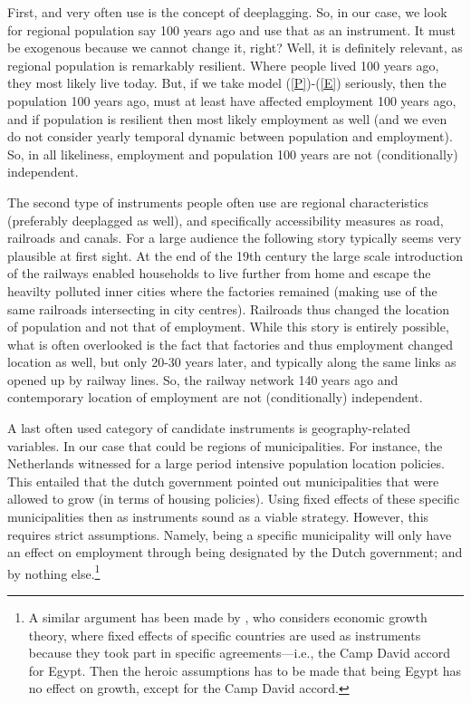 \documentclass[fleqn,10pt]{SelfArx} %
\begin{document}
First, and very often use is the concept of deeplagging. So, in our case, we
look for regional population say 100 years ago and use that as an instrument. It
must be exogenous because we cannot change it, right? Well, it is definitely
relevant, as regional population is remarkably resilient. Where people lived
100 years ago, they most likely live today. But, if we take model
(\ref{P})-(\ref{E}) seriously, then the population 100 years ago, must at least
have affected employment 100 years ago, and if population is resilient then most
likely employment as well (and we even do not consider yearly temporal dynamic
between population and employment). So, in all likeliness, employment and
population 100 years are not (conditionally) independent.

The second type of instruments people often use are regional characteristics
(preferably deeplagged as well), and specifically accessibility measures as
road, railroads and canals. For a large audience the following story typically seems very plausible at first
sight. At the end of the 19th century the large scale introduction of the
railways enabled households to live further from home and escape the heavilty
polluted inner cities where the factories remained (making use of the same
railroads intersecting in city centres). Railroads thus changed the location of
population and not that of employment. While this story is entirely possible,
what is often overlooked is the fact that factories and thus employment changed location as
well, but only 20-30 years later, and typically along the same links as opened
up by railway lines. So, the railway network 140 years ago and contemporary
location of employment are not (conditionally) independent.

A last often used category of candidate instruments is geography-related
variables. In our case that could be regions of municipalities. For instance,
the Netherlands witnessed for a large period intensive population location
policies. This entailed that the dutch government pointed out municipalities
that were allowed to grow (in terms of housing policies). Using fixed effects of
these specific municipalities then as instruments sound as a viable strategy.
However, this requires strict assumptions. Namely, being a specific municipality
will only have an effect on employment through being designated by the Dutch
government; and by nothing else.\footnote{A similar argument has been made by
  \cite{deaton2010instruments}, who considers economic growth theory, where fixed
  effects of specific countries are used as instruments because they took part
  in specific agreements---i.e., the Camp David accord for Egypt. Then the
  heroic assumptions has to be made that being Egypt has no effect on growth,
  except for the Camp David accord.}
\end{document}
